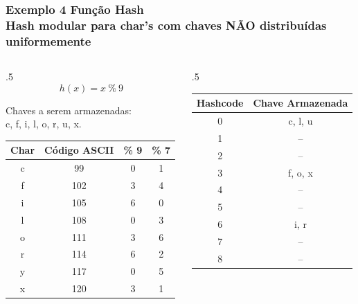 \documentclass{beamer}
\begin{document}
\begin{frame}
  \frametitle{Exemplo 4 Função Hash\\\small{Hash modular para char's com chaves NÃO distribuídas uniformemente}}

  \begin{columns}
    \begin{column}{.5\textwidth}
      \[ h(x) = x~\%~9 \]

      \center Chaves a serem armazenadas:\\c, f, i, l, o, r, u, x.
      \begin{table}[]
        \centering
        \small
        \begin{tabular}{@{}cccc@{}}
          \toprule
          Char & Código ASCII & \% 9 & \% 7 \\ \midrule
          c    & 99           & 0    & 1    \\
          f    & 102          & 3    & 4    \\
          i    & 105          & 6    & 0    \\
          l    & 108          & 0    & 3    \\
          o    & 111          & 3    & 6    \\
          r    & 114          & 6    & 2    \\
          y    & 117          & 0    & 5    \\
          x    & 120          & 3    & 1    \\ \bottomrule
        \end{tabular}
      \end{table}  
    \end{column}
    \begin{column}{.5\textwidth}

      \begin{table}[]
        \centering
        \small
        \begin{tabular}{@{}cc@{}}
          \toprule
          Hashcode & Chave Armazenada \\ \midrule
          0        & c, l, u          \\
          1        & --               \\
          2        & --               \\
          3        & f, o, x          \\
          4        & --               \\
          5        & --               \\
          6        & i, r             \\
          7        & --               \\
          8        & --               \\ \bottomrule
        \end{tabular}
      \end{table}  
    \end{column}
  \end{columns}
\end{frame}
\end{document}
